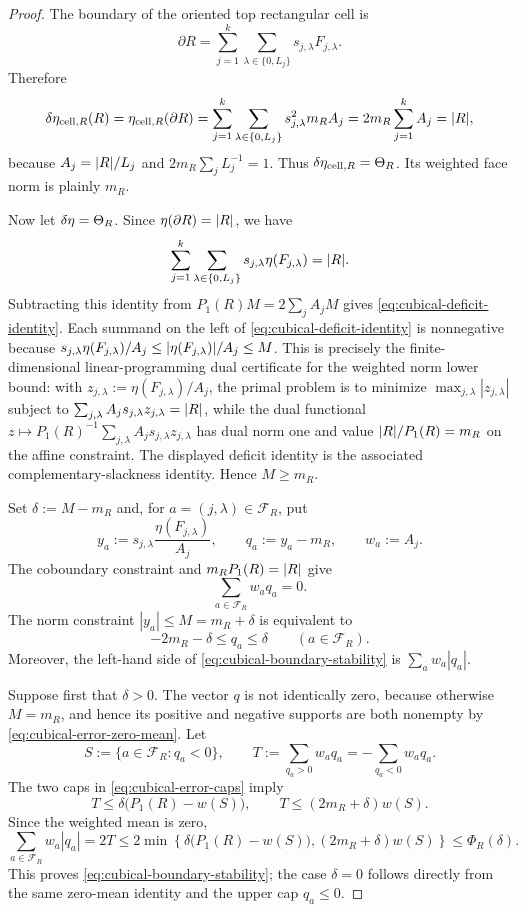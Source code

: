 \begin{proof}
The boundary of the oriented top rectangular cell is
\[
\partial R
=
\sum_{j=1}^k\sum_{\lambda\in\{0,L_j\}}
s_{j,\lambda}F_{j,\lambda}.
\]
Therefore
\[
\delta\eta_{\mathrm{cell},R}(R)
=
\eta_{\mathrm{cell},R}(\partial R)
=
\sum_{j=1}^k\sum_{\lambda\in\{0,L_j\}}
s_{j,\lambda}^2m_RA_j
=2m_R\sum_{j=1}^kA_j
=\lvert R \rvert,
\]
because $A_j=\lvert R \rvert/L_j$ and $2m_R\sum_jL_j^{-1}=1$. Thus
$\delta\eta_{\mathrm{cell},R}=\Theta_R$. Its weighted face norm is plainly $m_R$.

Now let $\delta\eta=\Theta_R$. Since $\eta(\partial R)=\lvert R \rvert$, we have
\[
\sum_{j=1}^k\sum_{\lambda\in\{0,L_j\}}
s_{j,\lambda}\eta(F_{j,\lambda})=\lvert R \rvert.
\]
Subtracting this identity from $P_1(R)M=2\sum_jA_jM$ gives
\eqref{eq:cubical-deficit-identity}. Each summand on the left of
\eqref{eq:cubical-deficit-identity} is nonnegative because
$s_{j,\lambda}\eta(F_{j,\lambda})/A_j\le
\lvert \eta(F_{j,\lambda}) \rvert/A_j\le M$. This is precisely the finite-dimensional
linear-programming dual certificate for the weighted norm lower bound: with
$z_{j,\lambda}:=\eta(F_{j,\lambda})/A_j$, the primal problem is to minimize
$\max_{j,\lambda}|z_{j,\lambda}|$ subject to
$\sum_{j,\lambda}A_js_{j,\lambda}z_{j,\lambda}=\lvert R \rvert$, while the dual functional
$z\mapsto P_1(R)^{-1}\sum_{j,\lambda}A_js_{j,\lambda}z_{j,\lambda}$ has dual norm one and value
$\lvert R \rvert/P_1(R)=m_R$ on the affine constraint. The displayed deficit identity
is the associated complementary-slackness identity. Hence $M\ge m_R$.

Set $\delta:=M-m_R$ and, for $a=(j,\lambda)\in\mathcal F_R$, put
\[
y_a:=s_{j,\lambda}\frac{\eta(F_{j,\lambda})}{A_j},
\qquad
q_a:=y_a-m_R,
\qquad
w_a:=A_j.
\]
The coboundary constraint and $m_RP_1(R)=\lvert R \rvert$ give
\begin{equation}
\label{eq:cubical-error-zero-mean}
\sum_{a\in\mathcal F_R}w_aq_a=0.
\end{equation}
The norm constraint $|y_a|\le M=m_R+\delta$ is equivalent to
\begin{equation}
\label{eq:cubical-error-caps}
-2m_R-\delta\le q_a\le\delta
\qquad(a\in\mathcal F_R).
\end{equation}
Moreover, the left-hand side of
\eqref{eq:cubical-boundary-stability} is
$\sum_aw_a|q_a|$.

Suppose first that $\delta>0$.  The vector $q$ is not identically zero,
because otherwise $M=m_R$, and hence its positive and negative supports are
both nonempty by \eqref{eq:cubical-error-zero-mean}. Let
\[
S:=\{a\in\mathcal F_R:q_a<0\},
\qquad
T:=\sum_{q_a>0}w_aq_a=-\sum_{q_a<0}w_aq_a.
\]
The two caps in \eqref{eq:cubical-error-caps} imply
\[
T\le\delta\bigl(P_1(R)-w(S)\bigr),
\qquad
T\le(2m_R+\delta)w(S).
\]
Since the weighted mean is zero,
\[
\sum_{a\in\mathcal F_R}w_a|q_a|=2T
\le
2\min\left\{
\delta\bigl(P_1(R)-w(S)\bigr),
(2m_R+\delta)w(S)
\right\}
\le\Phi_R(\delta).
\]
This proves \eqref{eq:cubical-boundary-stability}; the case $\delta=0$
follows directly from the same zero-mean identity and the upper cap $q_a\le0$.


\end{proof}
